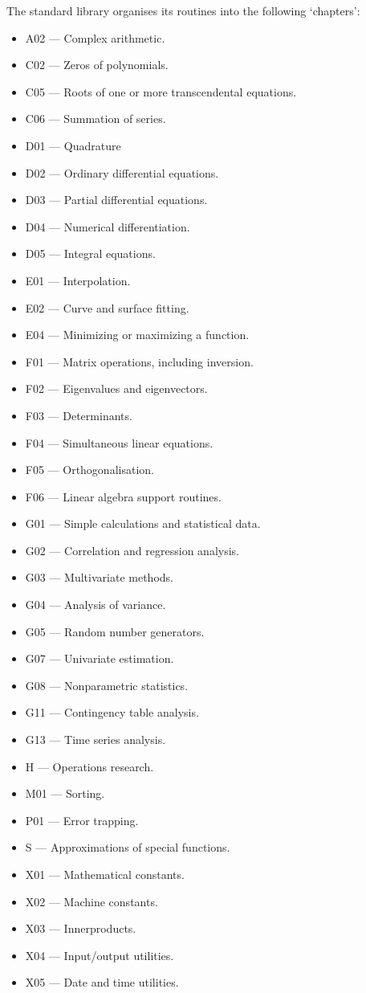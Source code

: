 \begin{description}
The standard library organises its routines into the following `chapters':
{\small
\begin{itemize}
\item A02 --- Complex arithmetic.
\item C02 --- Zeros of polynomials.
\item C05 --- Roots of one or more transcendental equations.
\item C06 --- Summation of series.
\item D01 --- Quadrature
\item D02 --- Ordinary differential equations.
\item D03 --- Partial differential equations.
\item D04 --- Numerical differentiation.
\item D05 --- Integral equations.
\item E01 --- Interpolation.
\item E02 --- Curve and surface fitting.
\item E04 --- Minimizing or maximizing a function.
\item F01 --- Matrix operations, including inversion.
\item F02 --- Eigenvalues and eigenvectors.
\item F03 --- Determinants.
\item F04 --- Simultaneous linear equations.
\item F05 --- Orthogonalisation.
\item F06 --- Linear algebra support routines.
\item G01 --- Simple calculations and statistical data.
\item G02 --- Correlation and regression analysis.
\item G03 --- Multivariate methods.
\item G04 --- Analysis of variance.
\item G05 --- Random number generators.
\item G07 --- Univariate estimation.
\item G08 --- Nonparametric statistics.
\item G11 --- Contingency table analysis.
\item G13 --- Time series analysis.
\item H --- Operations research.
\item M01 --- Sorting.
\item P01 --- Error trapping.
\item S --- Approximations of special functions.
\item X01 --- Mathematical constants.
\item X02 --- Machine constants.
\item X03 --- Innerproducts.
\item X04 --- Input/output utilities.
\item X05 --- Date and time utilities.
\end{itemize}
}


\end{description}
